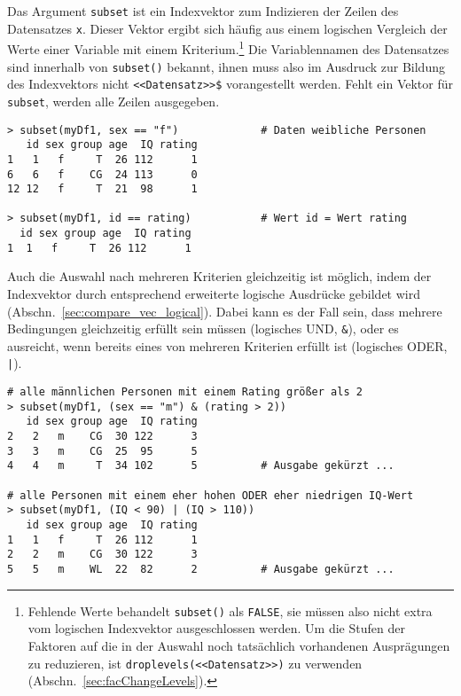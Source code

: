 Das Argument \lstinline!subset! ist ein Indexvektor zum Indizieren der Zeilen des Datensatzes \lstinline!x!. Dieser Vektor ergibt sich häufig aus einem logischen Vergleich der Werte einer Variable mit einem Kriterium.\footnote{\label{ftn:subset_na}Fehlende Werte behandelt \lstinline!subset()! als \lstinline!FALSE!, sie müssen also nicht extra vom logischen Indexvektor ausgeschlossen werden. Um die Stufen der Faktoren auf die in der Auswahl noch tatsächlich vorhandenen Ausprägungen zu reduzieren, ist \lstinline!droplevels(<<Datensatz>>)! zu verwenden (Abschn.\ \ref{sec:facChangeLevels}).} Die Variablennamen des Datensatzes sind innerhalb von \lstinline!subset()! bekannt, ihnen muss also im Ausdruck zur Bildung des Indexvektors nicht \lstinline!<<Datensatz>>$! vorangestellt werden. Fehlt ein Vektor für \lstinline!subset!, werden alle Zeilen ausgegeben.
\begin{lstlisting}
> subset(myDf1, sex == "f")             # Daten weibliche Personen
   id sex group age  IQ rating
1   1   f     T  26 112      1
6   6   f    CG  24 113      0
12 12   f     T  21  98      1

> subset(myDf1, id == rating)           # Wert id = Wert rating
  id sex group age  IQ rating
1  1   f     T  26 112      1
\end{lstlisting}

Auch die Auswahl nach mehreren Kriterien gleichzeitig ist möglich, indem der Indexvektor durch entsprechend erweiterte logische Ausdrücke gebildet wird (Abschn.\ \ref{sec:compare_vec_logical}). Dabei kann es der Fall sein, dass mehrere Bedingungen gleichzeitig erfüllt sein müssen (logisches UND, \lstinline!&!), oder es ausreicht, wenn bereits eines von mehreren Kriterien erfüllt ist (logisches ODER, \lstinline!|!).
\begin{lstlisting}
# alle männlichen Personen mit einem Rating größer als 2
> subset(myDf1, (sex == "m") & (rating > 2))
   id sex group age  IQ rating
2   2   m    CG  30 122      3
3   3   m    CG  25  95      5
4   4   m     T  34 102      5          # Ausgabe gekürzt ...

# alle Personen mit einem eher hohen ODER eher niedrigen IQ-Wert
> subset(myDf1, (IQ < 90) | (IQ > 110))
   id sex group age  IQ rating
1   1   f     T  26 112      1
2   2   m    CG  30 122      3
5   5   m    WL  22  82      2          # Ausgabe gekürzt ...
\end{lstlisting}

